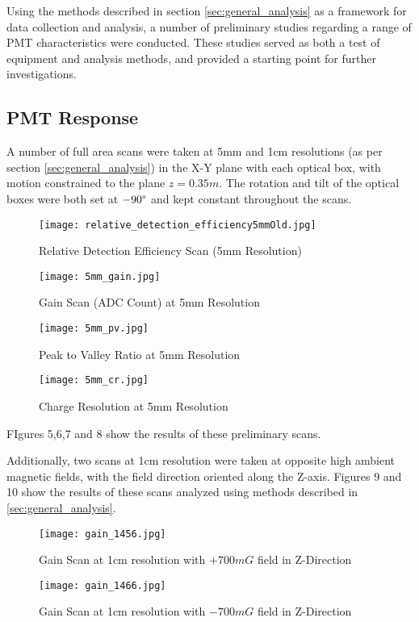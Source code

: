\documentclass[journal]{IEEEtran}
\begin{document}
Using the methods described in section \ref{sec:general_analysis} as a framework for data collection and analysis, a number of preliminary studies regarding a range of PMT characteristics were conducted.  These studies served as both a test of equipment and analysis methods, and provided a starting point for further investigations.

\subsection{PMT Response}

A number of full area scans were taken at 5mm and 1cm resolutions (as per section \ref{sec:general_analysis}) in the X-Y plane with each optical box, with motion constrained to the plane $z = 0.35m$.  The rotation and tilt of the optical boxes were both set at $-90\degree$ and kept constant throughout the scans.   
\FloatBarrier

\begin{figure}[!h]
	\centering	
	\texttt{[image: relative\_detection\_efficiency5mmOld.jpg]}
	\caption{Relative Detection Efficiency Scan (5mm Resolution)}
\end{figure}
\FloatBarrier
\begin{figure}[!htpb]
	\centering	
	\texttt{[image: 5mm\_gain.jpg]}
	\caption{Gain Scan (ADC Count) at 5mm Resolution}
\end{figure} 
\FloatBarrier
\begin{figure}[!htpb]
	\centering	
	\texttt{[image: 5mm\_pv.jpg]}
	\caption{Peak to Valley Ratio at 5mm Resolution}
\end{figure}
\FloatBarrier
\begin{figure}[!htpb]
	\centering	
	\texttt{[image: 5mm\_cr.jpg]}
	\caption{Charge Resolution at 5mm Resolution}
\end{figure}
\FloatBarrier

FIgures 5,6,7 and 8 show the results of these preliminary scans. 

Additionally, two scans at 1cm resolution were taken at opposite high ambient magnetic fields, with the field direction oriented along the Z-axis. Figures 9 and 10 show the results of these scans analyzed using methods described in \ref{sec:general_analysis}.

\FloatBarrier
\begin{figure}[!htpb]
	\centering	
	\texttt{[image: gain\_1456.jpg]}
	\caption{Gain Scan at 1cm resolution with $+700mG$ field in Z-Direction}
\end{figure}
\FloatBarrier
\begin{figure}[!htpb]
	\centering	
	\texttt{[image: gain\_1466.jpg]}
	\caption{Gain Scan at 1cm resolution with $-700mG$ field in Z-Direction}
\end{figure}
\FloatBarrier
\end{document}
